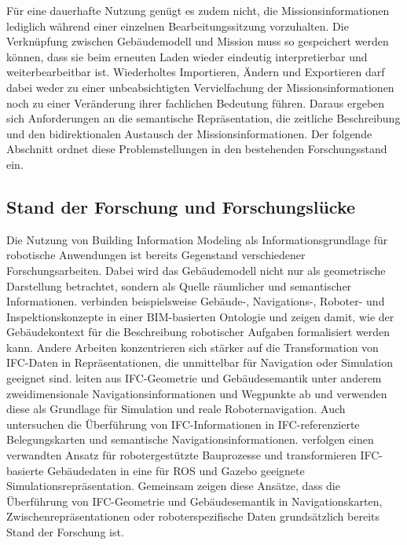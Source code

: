 Für eine dauerhafte Nutzung genügt es zudem nicht, die Missionsinformationen lediglich während einer
einzelnen Bearbeitungssitzung vorzuhalten. Die Verknüpfung zwischen Gebäudemodell und Mission muss
so gespeichert werden können, dass sie beim erneuten Laden wieder eindeutig interpretierbar und
weiterbearbeitbar ist. Wiederholtes Importieren, Ändern und Exportieren darf dabei weder zu einer
unbeabsichtigten Vervielfachung der Missionsinformationen noch zu einer Veränderung ihrer fachlichen
Bedeutung führen. Daraus ergeben sich Anforderungen an die semantische Repräsentation, die zeitliche
Beschreibung und den bidirektionalen Austausch der Missionsinformationen. Der folgende Abschnitt
ordnet diese Problemstellungen in den bestehenden Forschungsstand ein.

\subsection{Stand der Forschung und Forschungslücke}

Die Nutzung von Building Information Modeling als Informationsgrundlage für robotische Anwendungen
ist bereits Gegenstand verschiedener Forschungsarbeiten. Dabei wird das Gebäudemodell nicht nur als
geometrische Darstellung betrachtet, sondern als Quelle räumlicher und semantischer Informationen.
\textcite{bahreini2024ontology} verbinden beispielsweise Gebäude-, Navigations-, Roboter- und
Inspektionskonzepte in einer BIM-basierten Ontologie und zeigen damit, wie der Gebäudekontext für
die Beschreibung robotischer Aufgaben formalisiert werden kann. Andere Arbeiten konzentrieren sich
stärker auf die Transformation von IFC-Daten in Repräsentationen, die unmittelbar für Navigation
oder Simulation geeignet sind. \textcite{gopee2023improving} leiten aus IFC-Geometrie und
Gebäudesemantik unter anderem zweidimensionale Navigationsinformationen und Wegpunkte ab und
verwenden diese als Grundlage für Simulation und reale Roboternavigation. Auch
\textcite{wang2025bimtorobot} untersuchen die Überführung von IFC-Informationen in IFC-referenzierte
Belegungskarten und semantische Navigationsinformationen. \textcite{zhu2023component} verfolgen
einen verwandten Ansatz für robotergestützte Bauprozesse und transformieren IFC-basierte
Gebäudedaten in eine für ROS und Gazebo geeignete Simulationsrepräsentation. Gemeinsam zeigen diese
Ansätze, dass die Überführung von IFC-Geometrie und Gebäudesemantik in Navigationskarten,
Zwischenrepräsentationen oder roboterspezifische Daten grundsätzlich bereits Stand der Forschung
ist.

